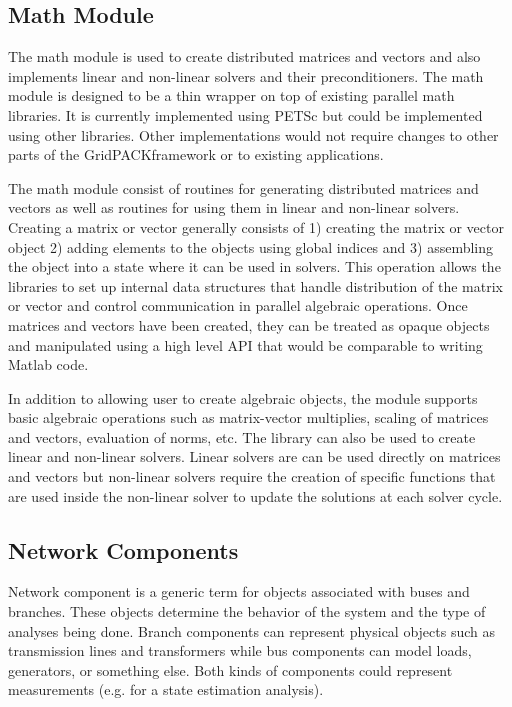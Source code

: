 \documentclass{acm_proc_article-sp}
\begin{document}
\subsection{Math Module}
The math module is used to create distributed matrices and vectors and also
implements linear and non-linear solvers and their preconditioners. The math
module is designed to be a thin wrapper on top of existing parallel math
libraries. It is currently implemented using PETSc but could be implemented
using other libraries. Other implementations would not require
changes to other parts of the GridPACK\texttrademark framework or to existing
applications.

The math module consist of routines for generating distributed matrices and
vectors as well as routines for using them in linear and non-linear solvers.
Creating a matrix or vector generally consists of 1) creating the matrix or
vector object 2) adding elements to the objects using global indices and 3)
assembling the object into a state where it can be used in solvers. This
operation allows the libraries to set up internal data structures that handle
distribution of the matrix or vector and control communication
in parallel algebraic operations. Once
matrices and vectors have been created, they can be treated
as opaque objects and manipulated using a
high level API that would be comparable to writing Matlab code.

In addition to allowing user to create algebraic objects, the module
supports basic algebraic operations such as matrix-vector multiplies, scaling of
matrices and vectors, evaluation of norms, etc. The library can
also be used to create linear and non-linear solvers. Linear solvers are
can be used directly on matrices and vectors but non-linear solvers require the
creation of specific
functions that are used inside the non-linear solver to update the solutions at
each solver cycle.

\subsection{Network Components}
Network component is a generic term for objects associated with buses and branches. These
objects determine the behavior of the system and the type of analyses being done. Branch
components can represent physical objects such as transmission lines and
transformers while bus components can model loads, generators, or
something else. Both kinds of components could represent measurements (e.g.
for a state estimation analysis). 
\end{document}
